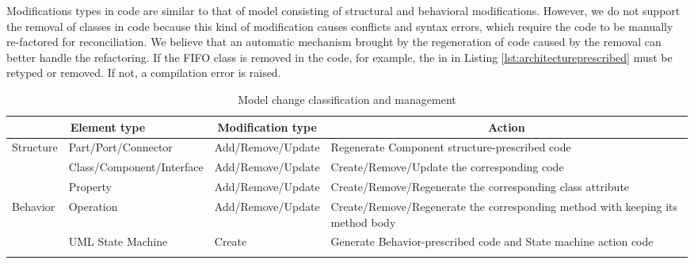 \vskip 0.2cm
\noindent
{}
Modifications types in code are similar to that of model consisting of structural and behavioral modifications.
However, we do not support the removal of classes in code because this kind of modification causes conflicts and syntax errors, which require the code to be manually re-factored for reconciliation. 
We believe that an automatic mechanism brought by the regeneration of code caused by the removal can better handle the refactoring.
If the FIFO class is removed in the code, for example, the  in  in Listing \ref{lst:architectureprescribed} must be retyped or removed.
If not, a compilation error is raised.
\begin{table*}[]
	\centering
	\caption{Model change classification and management}
	\label{table:modelchangeclassification}
	\begin{tabular}{|l|p{3cm}|l|p{9.5cm}|}
		\hline
		\multicolumn{2}{|c|}{Element type}                                                              & \multicolumn{1}{c|}{Modification type} & \multicolumn{1}{c|}{Action}                                                                              \\ \hline
		\multirow{3}{*}{Structure} & Part/Port/Connector                                                                & Add/Remove/Update                & Regenerate Component structure-prescribed code                                                                                          \\ \cline{2-4} 
		& Class/Component/Interface                                          & Add/Remove/Update                & Create/Remove/Update the corresponding code                                                              \\ \cline{2-4} 
		& Property                                                           & Add/Remove/Update                & Create/Remove/Regenerate the corresponding class attribute                                               \\ \hline
		\multirow{5}{*}{Behavior}  & Operation                                                          & Add/Remove/Update                & Create/Remove/Regenerate the corresponding method with keeping its method body                           \\ \cline{2-4} 
		& \multirow{3}{*}{UML State Machine}                                 & Create                           & Generate Behavior-prescribed code and State machine action code                                          \\ \cline{3-4} 

\end{tabular}
\end{table*}
